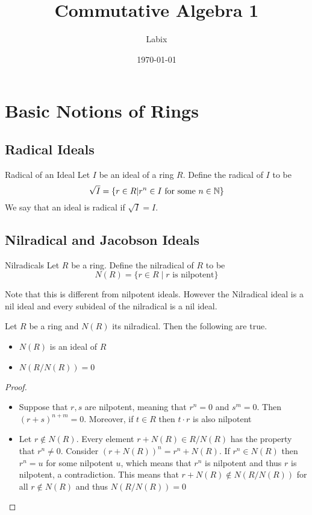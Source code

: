 \documentclass[a4paper]{article}
\title{Commutative Algebra 1}
\author{Labix}
\date{\today}
\begin{document}
\maketitle
\begin{abstract}
\end{abstract}
\pagebreak
\tableofcontents
\pagebreak

\pagebreak
\section{Basic Notions of Rings}
\subsection{Radical Ideals}
\begin{defn}{Radical of an Ideal}{} Let $I$ be an ideal of a ring $R$. Define the radical of $I$ to be $$\sqrt{I}=\{r\in R|r^n\in I\text{ for some }n\in\mathbb{N}\}$$
We say that an ideal is radical if $\sqrt{I}=I$. 
\end{defn}

\subsection{Nilradical and Jacobson Ideals}
\begin{defn}{Nilradicals}{} Let $R$ be a ring. Define the nilradical of $R$ to be $$N(R)=\{r\in R\;|\;r\text{ is nilpotent}\}$$
\end{defn}

Note that this is different from nilpotent ideals. However the Nilradical ideal is a nil ideal and every subideal of the nilradical is a nil ideal. 

\begin{prp}{}{} Let $R$ be a ring and $N(R)$ its nilradical. Then the following are true. 
\begin{itemize}
\item $N(R)$ is an ideal of $R$
\item $N(R/N(R))=0$
\end{itemize}\tcbline
\begin{proof}~\\
\begin{itemize}
\item Suppose that $r,s$ are nilpotent, meaning that $r^n=0$ and $s^m=0$. Then $(r+s)^{n+m}=0$. Moreover, if $t\in R$ then $t\cdot r$ is also nilpotent
\item Let $r\notin N(R)$. Every element $r+N(R)\in R/N(R)$ has the property that $r^n\neq 0$. Consider $(r+N(R))^n=r^n+N(R)$. If $r^n\in N(R)$ then $r^n=u$ for some nilpotent $u$, which means that $r^n$ is nilpotent and thus $r$ is nilpotent, a contradiction. This means that $r+N(R)\notin N(R/N(R))$ for all $r\notin N(R)$ and thus $N(R/N(R))=0$
\end{itemize}
\end{proof}
\end{prp}
\end{document}
